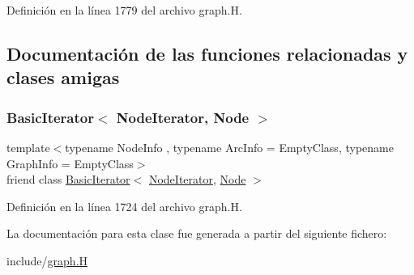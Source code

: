 Definición en la línea 1779 del archivo graph.\+H.



\subsection{Documentación de las funciones relacionadas y clases amigas}
\mbox{\label{class_designar_1_1_digraph_1_1_node_iterator_a21dc6ae614d097ff896e9e8e422d8f3c}} 
\subsubsection{\texorpdfstring{Basic\+Iterator$<$ Node\+Iterator, Node $>$}{BasicIterator< NodeIterator, Node >}}
{\footnotesize\ttfamily template$<$typename Node\+Info , typename Arc\+Info  = Empty\+Class, typename Graph\+Info  = Empty\+Class$>$ \\
friend class \hyperlink{class_designar_1_1_basic_iterator}{Basic\+Iterator}$<$ \hyperlink{class_designar_1_1_digraph_1_1_node_iterator}{Node\+Iterator}, \hyperlink{class_designar_1_1_digraph_a4dc921c41a480b7946a04170e997d8ae}{Node} $>$\hspace{0.3cm}{\ttfamily [friend]}}



Definición en la línea 1724 del archivo graph.\+H.



La documentación para esta clase fue generada a partir del siguiente fichero\+:\begin{DoxyCompactItemize}
\item 
include/\hyperlink{graph_8_h}{graph.\+H}\end{DoxyCompactItemize}
